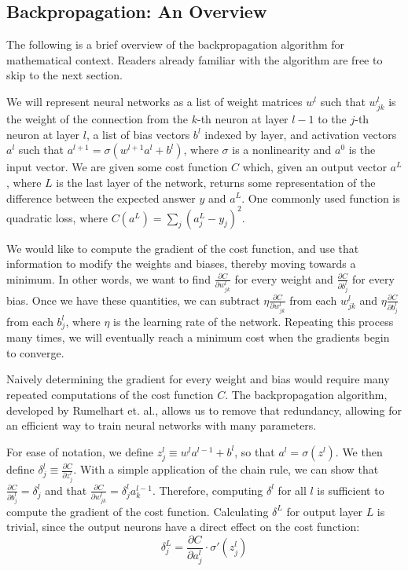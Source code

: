 \documentclass[12pt]{article}
\newcommand{\partialderiv}[2]{\frac{\partial #1}{\partial #2}}
\begin{document}
\subsection{Backpropagation: An Overview}
The following is a brief overview of the backpropagation algorithm for mathematical context. Readers already familiar with the algorithm are free to skip to the next section.

We will represent neural networks as a list of weight matrices $w^l$ such that $w^{l}_{jk}$ is the weight of the connection from the $k$-th neuron at layer $l-1$ to the $j$-th neuron at layer $l$, a list of bias vectors $b^l$ indexed by layer, and activation vectors $a^l$ such that $a^{l+1}=\sigma\left(w^{l+1}a^l + b^l\right)$, where $\sigma$ is a nonlinearity and $a^0$ is the input vector. We are given some cost function $C$ which, given an output vector $a^L$, where $L$ is the last layer of the network, returns some representation of the difference between the expected answer $y$ and $a^L$. One commonly used function is quadratic loss, where $C\left(a^L\right) = \sum_j \left(a^L_j - y_j\right)^2$.

We would like to compute the gradient of the cost function, and use that information to modify the weights and biases, thereby moving towards a minimum. In other words, we want to find $\partialderiv{C}{w^l_{jk}}$ for every weight and $\partialderiv{C}{b^l_j}$ for every bias. Once we have these quantities, we can subtract $\eta\partialderiv{C}{w^l_{jk}}$ from each $w^l_{jk}$ and $\eta\partialderiv{C}{b^l_{j}}$ from each $b^l_j$, where $\eta$ is the learning rate of the network. Repeating this process many times, we will eventually reach a minimum cost when the gradients begin to converge.

Naively determining the gradient for every weight and bias would require many repeated computations of the cost function $C$. The backpropagation algorithm, developed by Rumelhart et. al., allows us to remove that redundancy, allowing for an efficient way to train neural networks with many parameters. \cite{backprop}

For ease of notation, we define $z_j^l \equiv w^l a^{l-1} + b^l$, so that $a^l = \sigma(z^l)$. We then define $\delta_j^l \equiv\partialderiv{C}{z_j^l}$. With a simple application of the chain rule, we can show that $\partialderiv{C}{b_j^l} = \delta_j^l$ and that $\partialderiv{C}{w_{jk}^l} = \delta_j^l a_k^{l-1}$. Therefore, computing $\delta^l$ for all $l$ is sufficient to compute the gradient of the cost function. Calculating $\delta^L$ for output layer $L$ is trivial, since the output neurons have a direct effect on the cost function:
\begin{equation}
	\delta_j^L = \partialderiv{C}{a_j^l}\cdot\sigma'\left(z_j^l\right)\label{eq1}
\end{equation}
\end{document}
